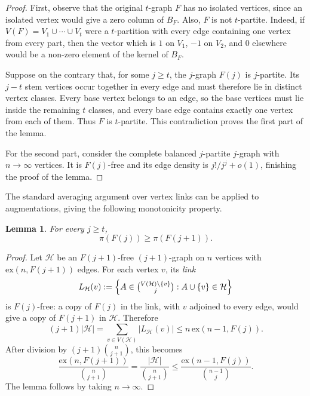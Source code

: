 \documentclass[10pt,a4paper]{article}
\numberwithin{equation}{section}
\newtheorem{lemma}[theorem]{Lemma}
\theoremstyle{definition}
\theoremstyle{remark}
\begin{document}
\begin{proof}
	First, observe that the original $t$-graph $F$ has no isolated vertices, since an isolated vertex would give a zero column of $B_F$.  Also, $F$ is not $t$-partite.  Indeed, if
	\(
	V(F)=V_1\cup\cdots\cup V_t
	\)
	were a $t$-partition with every edge containing one vertex from every part, then the vector which is $1$ on $V_1$, $-1$ on $V_2$, and $0$ elsewhere would be a non-zero element of the kernel of $B_F$.
	
	Suppose on the contrary that, for some $j\ge t$, the $j$-graph $F(j)$ is $j$-partite.  Its $j-t$ stem vertices occur together in every edge and must therefore lie in distinct vertex classes.  Every base vertex belongs to an edge, so the base vertices must lie inside the remaining $t$ classes, and every base edge contains exactly one vertex from each of them.  Thus $F$ is $t$-partite. This contradiction proves the first part of the lemma.
	
	For the second part, consider the complete balanced $j$-partite $j$-graph with $n\to\infty$ vertices. It is $F(j)$-free and its edge density is $j!/j^j+o(1)$, finishing the proof of the lemma.
\end{proof}



The standard averaging argument over vertex links can be applied to augmentations, giving the following monotonicity property.

\begin{lemma}\label{lem:app-augmentation-monotonicity}
	For every $j\ge t$,
	\begin{equation*}
		\pi(F(j))\ge\pi(F(j+1)).
	\end{equation*}
\end{lemma}

\begin{proof}
	Let $\mathcal H$ be an $F(j+1)$-free $(j+1)$-graph on $n$ vertices with $\mathrm{ex}(n,F(j+1))$ edges.  For each vertex $v$, its \emph{link}
	\[
	L_{\mathcal H}(v)
	:=\left\{A\in\tbinom{V(\mathcal H)\setminus\{v\}}j:A\cup\{v\}\in\mathcal H\right\}
	\]
	is $F(j)$-free: a copy of $F(j)$ in the link, with $v$ adjoined to every edge, would give a copy of $F(j+1)$ in $\mathcal H$.  Therefore
	\[
	(j+1)|\mathcal H|
	=\sum_{v\in V(\mathcal H)}|L_{\mathcal H}(v)|
	\le n\,\mathrm{ex}(n-1,F(j)).
	\]
	After division by $(j+1)\binom n{j+1}$, this becomes
	\[
	\frac{\mathrm{ex}(n,F(j+1))}{\binom{n}{j+1}}=\frac{|\mathcal H|}{\binom n{j+1}}
	\le
	\frac{\mathrm{ex}(n-1,F(j))}{\binom{n-1}j}.
	\]
	The lemma follows by taking $n\to\infty$. 
\end{proof}
\end{document}
